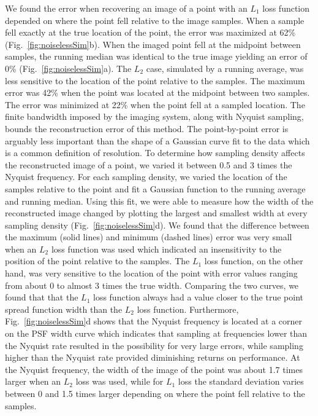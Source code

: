 \documentclass[12pt]{spieman}
\begin{document}
\begin{spacing}{2}
We found the error when recovering an image of a point with an $L_1$ loss function depended on where the point fell relative to the image samples. When a sample fell exactly at the true location of the point, the error was maximized at 62\% (Fig.~\ref{fig:noiselessSim}b). When the imaged point fell at the midpoint between samples, the running median was identical to the true image yielding an error of 0\% (Fig.~\ref{fig:noiselessSim}a). The $L_2$ case, simulated by a running average, was less sensitive to the location of the point relative to the samples. The maximum error was 42\% when the point was located at the midpoint between two samples. The error was minimized at 22\% when the point fell at a sampled location. The finite bandwidth imposed by the imaging system, along with Nyquist sampling, bounds the reconstruction error of this method. 
The point-by-point error is arguably less important than the shape of a Gaussian curve fit to the data which is a common definition of resolution. To determine how sampling density affects the reconstructed image of a point, we varied it between 0.5 and 3 times the Nyquist frequency. For each sampling density, we varied the location of the samples relative to the point and fit a Gaussian function to the running average and running median. Using this fit, we were able to measure how the width of the reconstructed image changed by plotting the largest and smallest width at every sampling density (Fig.~\ref{fig:noiselessSim}d). We found that the difference between the maximum (solid lines) and minimum (dashed lines) error was very small when an $L_2$ loss function was used which indicated an insensitivity to the position of the point relative to the samples. The $L_1$ loss function, on the other hand, was very sensitive to the location of the point with error values ranging from about 0 to almost 3 times the true width. Comparing the two curves, we found that that the $L_1$ loss function always had a value closer to the true point spread function width than the $L_2$ loss function. Furthermore, Fig.~\ref{fig:noiselessSim}d shows that the Nyquist frequency is located at a corner on the PSF width curve which indicates that sampling at frequencies lower than the Nyquist rate resulted in the possibility for very large errors, while sampling higher than the Nyquist rate provided diminishing returns on performance. At the Nyquist frequency, the width of the image of the point was about 1.7 times larger when an $L_2$ loss was used, while for $L_1$ loss the standard deviation varies between 0 and 1.5 times larger depending on where the point fell relative to the samples.


\end{spacing}
\end{document}
